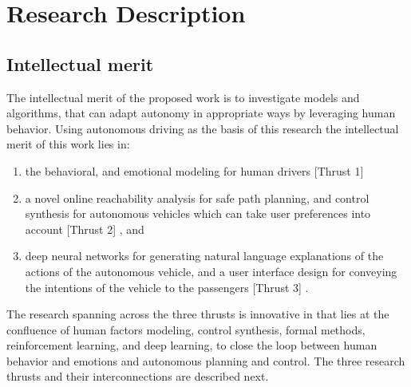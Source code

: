 \section{Research Description}
\label{sec:research}

\subsection{Intellectual merit}
\label{sec:im}

The intellectual merit of the proposed work is to investigate models and algorithms, that can adapt autonomy in appropriate ways by leveraging human behavior. Using autonomous driving as the basis of this research the intellectual merit of this work lies in:
\begin{enumerate}[itemsep=0pt,parsep=0pt,topsep=4pt,leftmargin=0.4in]
    \item the behavioral, and emotional modeling for human drivers [Thrust 1]
    \item a novel online reachability analysis for safe path planning, and control synthesis for autonomous vehicles which can take user preferences into account [Thrust 2]  , and
    \item deep neural networks for generating natural language explanations of the actions of the autonomous vehicle, and a user interface design for conveying the intentions of the vehicle to the passengers [Thrust 3] . 
\end{enumerate} 
The research spanning across the three thrusts is innovative in that lies at the confluence of human factors modeling, control synthesis, formal methods, reinforcement learning, and deep learning, to close the loop between human behavior and emotions and autonomous planning and control.
The three research thrusts and their interconnections are described next.






